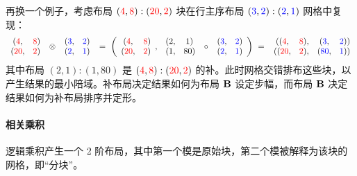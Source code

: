 再换一个例子，考虑布局 $(\textcolor{red}{4},\textcolor{red}{8}):(\textcolor{red}{20},\textcolor{red}{2})$ 块在行主序布局 $(\textcolor{blue}{3},\textcolor{blue}{2}):(\textcolor{blue}{2},\textcolor{blue}{1})$ 网格中复现：
\begin{align*}
\begin{array}{cc} (\textcolor{red}{4}, & \textcolor{red}{8}) \\ (\textcolor{red}{20}, & \textcolor{red}{2}) \end{array}
\ \otimes \
\begin{array}{cc} (\textcolor{blue}{3}, & \textcolor{blue}{2}) \\ (\textcolor{blue}{2}, & \textcolor{blue}{1}) \end{array}
\ = \
\left(
\begin{array}{cc} (\textcolor{red}{4}, & \textcolor{red}{8}) \\ (\textcolor{red}{20}, & \textcolor{red}{2}) \end{array}, \
\begin{array}{cc} (2, & 1) \\ (1, & 80) \end{array}
\ \circ \
\begin{array}{cc} (\textcolor{blue}{3}, & \textcolor{blue}{2}) \\ (\textcolor{blue}{2}, & \textcolor{blue}{1}) \end{array}
\right)
\ = \
\begin{array}{cccc}((\textcolor{red}{4}, & \textcolor{red}{8}), & (\textcolor{blue}{3}, & \textcolor{blue}{2})) \\ ((\textcolor{red}{20}, & \textcolor{red}{2}), & (\textcolor{blue}{80}, & \textcolor{blue}{1})) \end{array}
\end{align*}
其中布局 $(2,1):(1,80)$ 是 $(\textcolor{red}{4},\textcolor{red}{8}):(\textcolor{red}{20},\textcolor{red}{2})$ 的补。此时网格交错排布这些块，以产生结果的最小陪域。补布局决定结果如何为布局 $\mathbf{B}$ 设定步幅，而布局 $\mathbf{B}$ 决定结果如何为补布局排序并定形。

\paragraph{相关乘积}

逻辑乘积产生一个 2 阶布局，其中第一个模是原始块，第二个模被解释为该块的网格，即“分块”。

